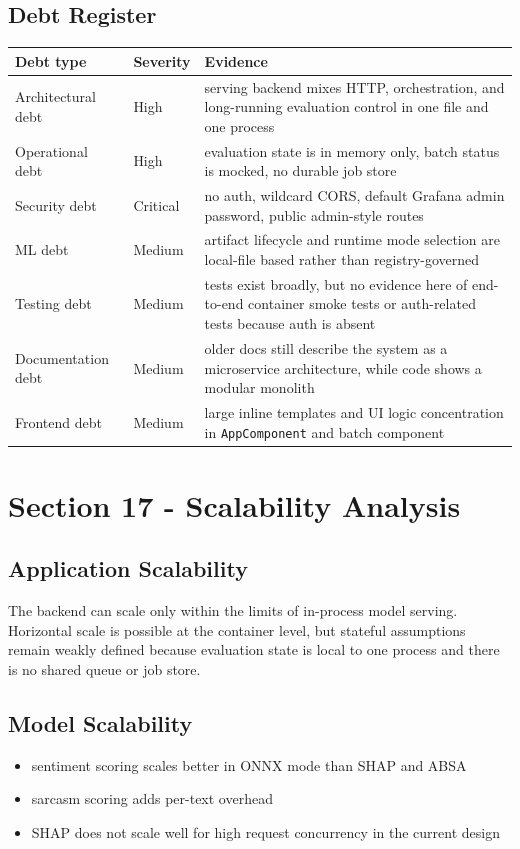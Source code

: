 \subsection{Debt Register}
\begin{table}[H]
\centering
\begin{tabularx}{\textwidth}{@{}l l X@{}}
\toprule
\textbf{Debt type} & \textbf{Severity} & \textbf{Evidence} \\
\midrule
Architectural debt & High & serving backend mixes HTTP, orchestration, and long-running evaluation control in one file and one process \\
Operational debt & High & evaluation state is in memory only, batch status is mocked, no durable job store \\
Security debt & Critical & no auth, wildcard CORS, default Grafana admin password, public admin-style routes \\
ML debt & Medium & artifact lifecycle and runtime mode selection are local-file based rather than registry-governed \\
Testing debt & Medium & tests exist broadly, but no evidence here of end-to-end container smoke tests or auth-related tests because auth is absent \\
Documentation debt & Medium & older docs still describe the system as a microservice architecture, while code shows a modular monolith \\
Frontend debt & Medium & large inline templates and UI logic concentration in \texttt{AppComponent} and batch component \\
\bottomrule
\end{tabularx}
\end{table}

\section{Section 17 - Scalability Analysis}
\subsection{Application Scalability}
The backend can scale only within the limits of in-process model serving. Horizontal scale is possible at the container level, but stateful assumptions remain weakly defined because evaluation state is local to one process and there is no shared queue or job store.

\subsection{Model Scalability}
\begin{itemize}[leftmargin=1.2em]
  \item sentiment scoring scales better in ONNX mode than SHAP and ABSA
  \item sarcasm scoring adds per-text overhead
  \item SHAP does not scale well for high request concurrency in the current design
\end{itemize}

